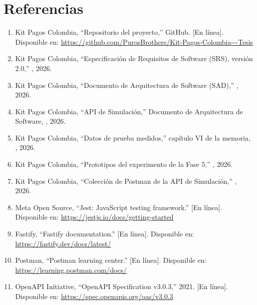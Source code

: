 \section{Referencias}
\label{sec:referencias}

\begingroup\sloppy
\begin{enumerate}
  \renewcommand{\labelenumi}{[\arabic{enumi}]}

  \item Kit Pagos Colombia, ``Repositorio del proyecto,'' GitHub. [En línea]. Disponible en: \url{https://github.com/PurosBrothers/Kit-Pagos-Colombia---Tesis}

  \item Kit Pagos Colombia, ``Especificación de Requisitos de Software (SRS), versión 2.0,'' , 2026.

  \item Kit Pagos Colombia, ``Documento de Arquitectura de Software (SAD),'' , 2026.

  \item Kit Pagos Colombia, ``API de Simulación,'' Documento de Arquitectura de Software, , 2026.

  \item Kit Pagos Colombia, ``Datos de prueba medidos,'' capítulo VI de la memoria, , 2026.

  \item Kit Pagos Colombia, ``Prototipos del experimento de la Fase 5,'' , 2026.

  \item Kit Pagos Colombia, ``Colección de Postman de la API de Simulación,'' , 2026.

  \item Meta Open Source, ``Jest: JavaScript testing framework.'' [En línea]. Disponible en: \url{https://jestjs.io/docs/getting-started}

  \item Fastify, ``Fastify documentation.'' [En línea]. Disponible en: \url{https://fastify.dev/docs/latest/}

  \item Postman, ``Postman learning center.'' [En línea]. Disponible en: \url{https://learning.postman.com/docs/}

  \item OpenAPI Initiative, ``OpenAPI Specification v3.0.3,'' 2021. [En línea]. Disponible en: \url{https://spec.openapis.org/oas/v3.0.3}


\end{enumerate}
